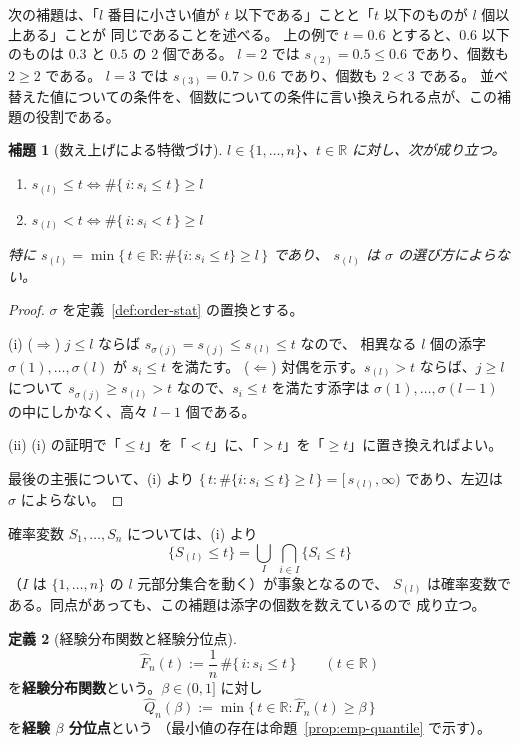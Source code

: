 \documentclass[a4paper,11pt]{jsarticle}
\theoremstyle{definition}
\newtheorem{definition}{定義}[section]
\theoremstyle{plain}
\newtheorem{lemma}[definition]{補題}
\theoremstyle{remark}
\newcommand{\Real}{\mathbb{R}}
\begin{document}
次の補題は、「$l$ 番目に小さい値が $t$ 以下である」ことと「$t$ 以下のものが $l$ 個以上ある」ことが
同じであることを述べる。
上の例で $t=0.6$ とすると、$0.6$ 以下のものは $0.3$ と $0.5$ の $2$ 個である。
$l=2$ では $s_{(2)}=0.5\le0.6$ であり、個数も $2\ge2$ である。
$l=3$ では $s_{(3)}=0.7>0.6$ であり、個数も $2<3$ である。
並べ替えた値についての条件を、個数についての条件に言い換えられる点が、この補題の役割である。

\begin{lemma}[数え上げによる特徴づけ]
  \label{lem:order-count}
  $l\in\{1,\dots,n\}$、$t\in\Real$ に対し、次が成り立つ。
  \begin{enumerate}
    \item[(i)] $s_{(l)}\le t\iff\#\{\,i: s_i\le t\,\}\ge l$
    \item[(ii)] $s_{(l)}<t\iff\#\{\,i: s_i<t\,\}\ge l$
  \end{enumerate}
  特に $s_{(l)}=\min\{\,t\in\Real:\#\{i: s_i\le t\}\ge l\,\}$ であり、
  $s_{(l)}$ は $\sigma$ の選び方によらない。
\end{lemma}

\begin{proof}
  $\sigma$ を定義~\ref{def:order-stat} の置換とする。

  (i) ($\Rightarrow$) $j\le l$ ならば $s_{\sigma(j)}=s_{(j)}\le s_{(l)}\le t$ なので、
  相異なる $l$ 個の添字 $\sigma(1),\dots,\sigma(l)$ が $s_i\le t$ を満たす。
  ($\Leftarrow$) 対偶を示す。$s_{(l)}>t$ ならば、$j\ge l$ について
  $s_{\sigma(j)}\ge s_{(l)}>t$ なので、$s_i\le t$ を満たす添字は
  $\sigma(1),\dots,\sigma(l-1)$ の中にしかなく、高々 $l-1$ 個である。

  (ii) (i) の証明で「$\le t$」を「$<t$」に、「$>t$」を「$\ge t$」に置き換えればよい。

  最後の主張について、(i) より
  $\{\,t:\#\{i: s_i\le t\}\ge l\,\}=[\,s_{(l)},\infty)$ であり、左辺は $\sigma$ によらない。
\end{proof}

確率変数 $S_1,\dots,S_n$ については、(i) より
\begin{equation*}
  \{S_{(l)}\le t\}=\bigcup_{I}\ \bigcap_{i\in I}\{S_i\le t\}
\end{equation*}
（$I$ は $\{1,\dots,n\}$ の $l$ 元部分集合を動く）が事象となるので、
$S_{(l)}$ は確率変数である。同点があっても、この補題は添字の個数を数えているので
成り立つ。

\begin{definition}[経験分布関数と経験分位点]
  \label{def:emp-quantile}
  \begin{equation*}
    \hat F_n(t):=\frac1n\,\#\{\,i: s_i\le t\,\}\qquad(t\in\Real)
  \end{equation*}
  を\textbf{経験分布関数}という。$\beta\in(0,1]$ に対し
  \begin{equation*}
    \hat Q_n(\beta):=\min\{\,t\in\Real:\hat F_n(t)\ge\beta\,\}
  \end{equation*}
  を\textbf{経験 $\beta$ 分位点}という
  （最小値の存在は命題~\ref{prop:emp-quantile} で示す）。
\end{definition}
\end{document}
